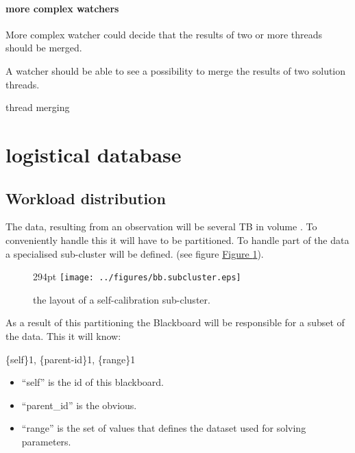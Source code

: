 \documentclass[]{lofar}
\begin{document}
        \paragraph{more complex watchers}
        \label{par:complex-watchers}\hypertarget{par:complex-watchers}{}

          More complex watcher could decide that the results of two or
          more threads should be merged.

          \begin{requirement}
            A watcher should be able to see a possibility to merge the
            results of two solution threads.
            \caption{thread merging\label{req:merge}}
          \end{requirement}

  \section{logistical database}
  \label{sec:logistical-datamodel}
  \hypertarget{sec:logistical-datamodel}{}

    \subsection{Workload distribution}
    \label{subsec:workload-distribution-2}\hypertarget{subsec:workload-distribution-2}{}

      The data, resulting from an observation will be several TB in
      volume \cite{bib:LOFAR-ASTRON-MEM-035}. To conveniently handle
      this it will have to be partitioned. To handle part of the data
      a specialised sub-cluster will be defined. (see figure
      \hyperlink{fig:bb.subcluster}{Figure \ref{fig:bb.subcluster}}).

      \begin{figure}{294pt}
        \texttt{[image: ../figures/bb.subcluster.eps]}
        \hypertarget{fig:bb.subcluster}{}
        \caption{the layout of a self-calibration sub-cluster.\label{fig:bb.subcluster}}
      \end{figure}

      As a result of this partitioning the Blackboard will be
      responsible for a subset of the data. This it will know:

      \{self\}1, \{parent-id\}1, \{range\}1

      \begin{itemize}

        \item 

          ``self'' is the id of this blackboard.

        \item 

          ``parent\_id'' is the obvious.

        \item 

          ``range'' is the set of values that defines the dataset used
          for solving parameters.

      \end{itemize}
\end{document}
